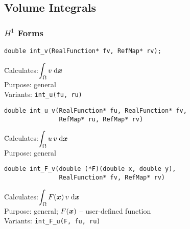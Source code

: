 
\subsection{Volume Integrals}
\label{sec:volint}

\subsubsection{$H^1$ Forms}


\newcommand{\info}[2]{
  \vspace{-4.5mm}
  \begin{tabbing}
  \hspace{9mm} \= Calculates:\quad \= {#1} \\[1.5mm]
                \> Purpose:         \> {#2}
  \end{tabbing}
  \smallskip
}
\newcommand{\infov}[3]{
  \vspace{-4.5mm}
  \begin{tabbing}
  \hspace{9mm} \= Calculates:\quad \= {#1} \\[1.5mm]
                \> Purpose:         \> {#2} \\[1mm]
                \> Variants:        \> #3
  \end{tabbing}
  \smallskip
}
\newcommand{\none}{\it none}
\newcommand{\volint}{\displaystyle\int_\Omega}
\newcommand{\dx}{\;\mbox{d}\bfx}
\newcommand{\var}{\tt\small}




\begin{lstlisting}
double int_v(RealFunction* fv, RefMap* rv);
\end{lstlisting}
\infov{$\volint v \dx$}
      {general}
      {\var int\_u(fu, ru)}



\begin{lstlisting}
double int_u_v(RealFunction* fu, RealFunction* fv,
               RefMap* ru, RefMap* rv)
\end{lstlisting}
\info{$\volint u\,v \dx$}
     {general}



\begin{lstlisting}
double int_F_v(double (*F)(double x, double y),
               RealFunction* fv, RefMap* rv)
\end{lstlisting}
\infov{$\volint F(\bfx)\,v \dx$}
      {general; $F(\mbox{\boldmath $x$})$ -- user-defined function}
      {\var int\_F\_u(F, fu, ru)}



